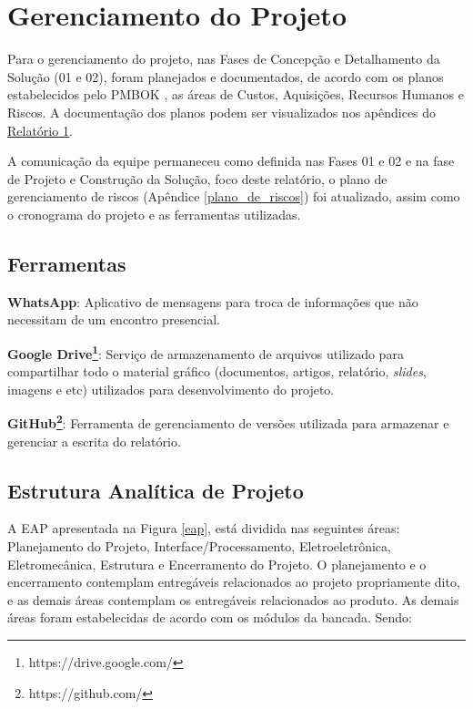 \chapter{Gerenciamento do Projeto}

Para o gerenciamento do projeto, nas Fases de Concepção e Detalhamento da Solução (01 e 02), foram planejados e documentados, de acordo com os planos estabelecidos pelo PMBOK \cite{pmbok}, as
áreas de Custos, Aquisições, Recursos Humanos e Riscos. A documentação dos planos podem ser visualizados nos apêndices do
\href{https://drive.google.com/file/d/0B5InkGKx6O-MR1B3eVYzZFpjQ3c/view?usp=sharing}{Relatório 1}.

A comunicação da equipe permaneceu como definida nas Fases 01 e 02 e na fase de Projeto e Construção da Solução, foco deste relatório, o plano de gerenciamento de riscos
(Apêndice \ref{plano_de_riscos}) foi atualizado, assim como o cronograma do projeto e as ferramentas utilizadas.

\section*{Ferramentas}

\textbf{WhatsApp}:
Aplicativo de mensagens para troca de informações que não necessitam de um encontro presencial.

\textbf{Google Drive\footnote{https://drive.google.com/}}: Serviço de armazenamento de arquivos utilizado para compartilhar todo o material gráfico (documentos, artigos, relatório, \textit{slides}, imagens e etc) utilizados para desenvolvimento do projeto.

\textbf{GitHub\footnote{https://github.com/}}: Ferramenta de gerenciamento de versões utilizada para armazenar e gerenciar
a escrita do relatório.

\section*{Estrutura Analítica de Projeto}

A EAP apresentada na Figura \ref{eap}, está dividida nas seguintes áreas: Planejamento do Projeto, Interface/Processamento, Eletroeletrônica, Eletromecânica, Estrutura e Encerramento do Projeto. O planejamento e o encerramento contemplam entregáveis relacionados ao projeto propriamente dito, e as demais áreas contemplam os entregáveis relacionados ao produto. As demais áreas foram estabelecidas de acordo com os módulos da bancada. Sendo:

